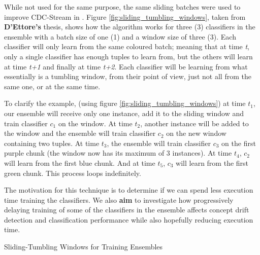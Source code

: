 While not used for the same purpose, the same sliding batches were used to improve CDC-Stream in \citep{d2016fine,d2017context}. Figure \ref{fig:sliding_tumbling_windows}, taken from \textbf{D'Ettore's} thesis, shows how the algorithm works for three (3) classifiers in the ensemble with a batch size of one (1) and a window size of three (3). Each classifier will only learn from the same coloured batch; meaning that at time \textit{t}, only a single classifier has enough tuples to learn from, but the others will learn at time \textit{t+1} and finally at time \textit{t+2}. Each classifier will be learning from what essentially is a tumbling window, from their point of view, just not all from the same one, or at the same time. 

To clarify the example, (using figure \ref{fig:sliding_tumbling_windows}) at time $t_1$, our ensemble will receive only one instance, add it to the sliding window and train classifier $c_1$ on the window. At time $t_2$, another instance will be added to the window and the ensemble will train classifier $c_2$ on the new window containing two tuples. At time $t_3$, the ensemble will train classifier $c_3$ on the first purple chunk (the window now has its maximum of 3 instances). At time $t_4$, $c_2$ will learn from the first blue chunk. And at time $t_5$, $c_3$ will learn from the first green chunk. This process loops indefinitely. 

The motivation for this technique is to determine if we can spend less execution time training the classifiers. We also \textbf{aim} to investigate how progressively delaying training of some of the classifiers in the ensemble affects concept drift detection and classification performance while also hopefully reducing execution time.

\begin{algorithm}
\caption{Sliding-Tumbling Windows for Training Ensembles\label{alg:sliding_tumbling_windows}}
\end{algorithm}

